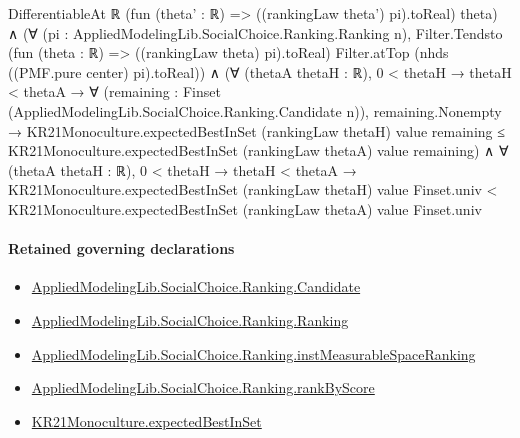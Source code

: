 \documentclass[10pt]{article}
\begin{document}
\begin{ReviewVerbatim}
                                      DifferentiableAt ℝ (fun (theta' : ℝ) => ((rankingLaw theta') pi).toReal) theta) ∧
                              (∀ (pi : AppliedModelingLib.SocialChoice.Ranking.Ranking n),
                                  Filter.Tendsto (fun (theta : ℝ) => ((rankingLaw theta) pi).toReal) Filter.atTop
                                    (nhds ((PMF.pure center) pi).toReal)) ∧
                                (∀ (thetaA thetaH : ℝ),
                                    0 < thetaH →
                                      thetaH < thetaA →
                                        ∀ (remaining : Finset (AppliedModelingLib.SocialChoice.Ranking.Candidate n)),
                                          remaining.Nonempty →
                                            KR21Monoculture.expectedBestInSet (rankingLaw thetaH) value remaining ≤
                                              KR21Monoculture.expectedBestInSet (rankingLaw thetaA) value remaining) ∧
                                  ∀ (thetaA thetaH : ℝ),
                                    0 < thetaH →
                                      thetaH < thetaA →
                                        KR21Monoculture.expectedBestInSet (rankingLaw thetaH) value Finset.univ <
                                          KR21Monoculture.expectedBestInSet (rankingLaw thetaA) value Finset.univ
\end{ReviewVerbatim}

\paragraph{Retained governing declarations}
\begin{itemize}\raggedright
\item \hyperlink{library-prerequisite-8c0e6c25845ae78a}{Applied\allowbreak{}Modeling\allowbreak{}Lib.\allowbreak{}Social\allowbreak{}Choice.\allowbreak{}Ranking.\allowbreak{}Candidate}
\item \hyperlink{library-prerequisite-5cde54446d1ae021}{Applied\allowbreak{}Modeling\allowbreak{}Lib.\allowbreak{}Social\allowbreak{}Choice.\allowbreak{}Ranking.\allowbreak{}Ranking}
\item \hyperlink{governing-declaration-30ca9c740ef703ec}{Applied\allowbreak{}Modeling\allowbreak{}Lib.\allowbreak{}Social\allowbreak{}Choice.\allowbreak{}Ranking.\allowbreak{}inst\allowbreak{}Measurable\allowbreak{}Space\allowbreak{}Ranking}
\item \hyperlink{governing-declaration-c2e98278351275b0}{Applied\allowbreak{}Modeling\allowbreak{}Lib.\allowbreak{}Social\allowbreak{}Choice.\allowbreak{}Ranking.\allowbreak{}rank\allowbreak{}By\allowbreak{}Score}
\item \hyperlink{paper-prerequisite-b8698660538f90e1}{KR21\allowbreak{}Monoculture.\allowbreak{}expected\allowbreak{}Best\allowbreak{}In\allowbreak{}Set}
\end{itemize}
\end{document}

